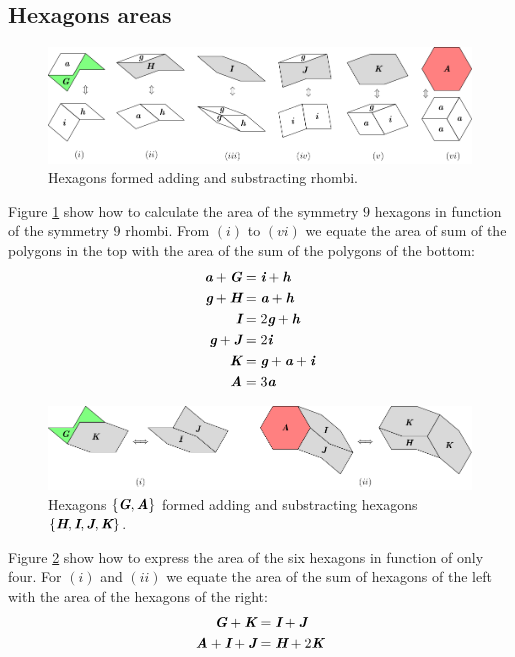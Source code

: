 \documentclass[11pt]{article}
\def\mathbi#1{\textbf{\em #1}}
\begin{document}
\subsection{Hexagons areas}

\begin{figure}[H]
\centering
\includegraphics[scale=1]{hexagons-from-rhombi-9}
\caption{Hexagons formed adding and substracting rhombi.}
\label{fig:hexagons-from-rhombi-9}
\end{figure}

Figure \ref{fig:hexagons-from-rhombi-9} show how to calculate the area of the symmetry $9$ hexagons in function of the symmetry $9$ rhombi. From $(i)$ to $(vi)$ we equate the area of sum of the polygons in the top with the area of the sum of the polygons of the bottom:
\begin{align}
\mathbi{a} + \mathbi{G} &= \mathbi{i} + \mathbi{h} \\
\mathbi{g} + \mathbi{H} &= \mathbi{a} + \mathbi{h} \\
\mathbi{I} &= 2\mathbi{g} + \mathbi{h} \\
\mathbi{g} + \mathbi{J} &= 2\mathbi{i} \\
\mathbi{K} &= \mathbi{g} + \mathbi{a} + \mathbi{i} \\
\mathbi{A} &= 3\mathbi{a}
\end{align}

\begin{figure}[H]
\centering
\includegraphics[scale=1]{hexagons-from-hexagons-9}
\caption{Hexagons $\{\mathbi{G},\mathbi{A}\}$ formed adding and substracting hexagons $\{\mathbi{H},\mathbi{I},\mathbi{J},\mathbi{K}\}$.}
\label{fig:hexagons-from-hexagons-9}
\end{figure}

Figure \ref{fig:hexagons-from-hexagons-9} show how to express the area of the six hexagons in function of only four. For $(i)$ and $(ii)$ we equate the area of the sum of hexagons of the left with the area of the hexagons of the right:
\begin{align}
\mathbi{G} + \mathbi{K} &= \mathbi{I} + \mathbi{J} \\
\mathbi{A} + \mathbi{I} + \mathbi{J} &= \mathbi{H} + 2\mathbi{K}
\end{align}
\end{document}
